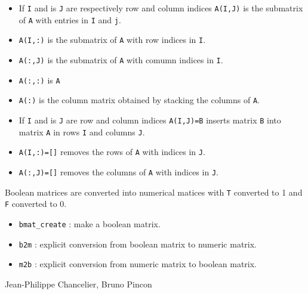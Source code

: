 \begin{itemize}
   \item If \verb+I+ and is \verb+J+ are respectively row and column indices \verb+A(I,J)+ is the submatrix of \verb+A+ with entries in \verb+I+ and \verb+j+.
   \item \verb+A(I,:)+ is the submatrix of \verb+A+ with row indices in \verb+I+.
   \item \verb+A(:,J)+ is the submatrix of \verb+A+ with comumn indices in \verb+I+.
   \item \verb+A(:,:)+ is \verb+A+
   \item \verb+A(:)+  is the column matrix obtained by stacking the columns of \verb+A+.
\end{itemize}
\begin{itemize}
   \item If \verb+I+ and is \verb+J+ are row and column indices \verb+A(I,J)=B+ inserts
matrix \verb+B+ into matrix \verb+A+ in rows \verb+I+ and columns \verb!J!.
   \item \verb+A(I,:)=[]+ removes the rows of \verb+A+ with indices in \verb+J+.
   \item \verb+A(:,J)=[]+ removes the columns of \verb+A+ with indices in \verb+J+.
\end{itemize}

Boolean matrices are converted into numerical matices with \verb+T+ converted to 1 
and \verb+F+ converted to 0. 
\begin{itemize}
\item \verb+bmat_create+ : make a boolean matrix.
\item \verb+b2m+ : explicit conversion from boolean matrix to numeric matrix.
\item \verb+m2b+ : explicit conversion from numeric matrix to boolean matrix.
\end{itemize}
\begin{manseealso}

\end{manseealso}

\begin{authors}
   Jean-Philippe Chancelier, Bruno Pincon
\end{authors}
